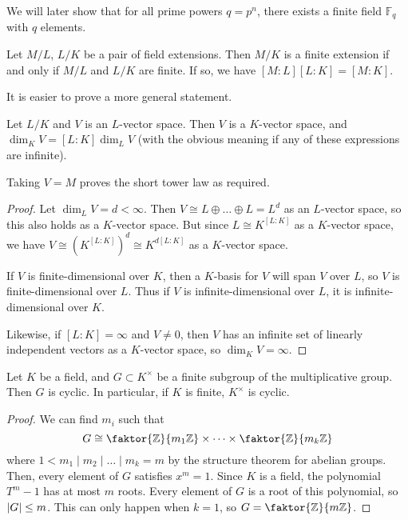 We will later show that for all prime powers \( q = p^n \), there exists a finite field \( \mathbb F_q \) with \( q \) elements.
\begin{theorem}
	Let \( M / L \), \( L / K \) be a pair of field extensions.
	Then \( M / K \) is a finite extension if and only if \( M / L \) and \( L / K \) are finite.
	If so, we have \( [M:L][L:K] = [M:K] \).
\end{theorem}
It is easier to prove a more general statement.
\begin{theorem}
	Let \( L / K \) and \( V \) is an \( L \)-vector space.
	Then \( V \) is a \( K \)-vector space, and \( \dim_K V = [L:K] \dim_L V \) (with the obvious meaning if any of these expressions are infinite).
\end{theorem}
Taking \( V = M \) proves the short tower law as required.
\begin{proof}
	Let \( \dim_L V = d < \infty \).
	Then \( V \cong L \oplus \dots \oplus L = L^d \) as an \( L \)-vector space, so this also holds as a \( K \)-vector space.
	But since \( L \cong K^{[L:K]} \) as a \( K \)-vector space, we have \( V \cong (K^{[L:K]})^d \cong K^{d[L:K]} \) as a \( K \)-vector space.

	If \( V \) is finite-dimensional over \( K \), then a \( K \)-basis for \( V \) will span \( V \) over \( L \), so \( V \) is finite-dimensional over \( L \).
	Thus if \( V \) is infinite-dimensional over \( L \), it is infinite-dimensional over \( K \).

	Likewise, if \( [L:K] = \infty \) and \( V \neq 0 \), then \( V \) has an infinite set of linearly independent vectors as a \( K \)-vector space, so \( \dim_K V = \infty \).
\end{proof}
\begin{proposition}
	Let \( K \) be a field, and \( G \subset K^\times \) be a finite subgroup of the multiplicative group.
	Then \( G \) is cyclic.
	In particular, if \( K \) is finite, \( K^\times \) is cyclic.
\end{proposition}
\begin{proof}
	We can find \( m_i \) such that
	\[ G \cong \faktor{\mathbb Z}{m_1\mathbb Z} \times \dots \times \faktor{\mathbb Z}{m_k \mathbb Z} \]
	where \( 1 < m_1 \mid m_2 \mid \dots \mid m_k = m \) by the structure theorem for abelian groups.
	Then, every element of \( G \) satisfies \( x^m = 1 \).
	Since \( K \) is a field, the polynomial \( T^m - 1 \) has at most \( m \) roots.
	Every element of \( G \) is a root of this polynomial, so \( \abs{G} \leq m \).
	This can only happen when \( k = 1 \), so \( G = \faktor{\mathbb Z}{m\mathbb Z} \).
\end{proof}
